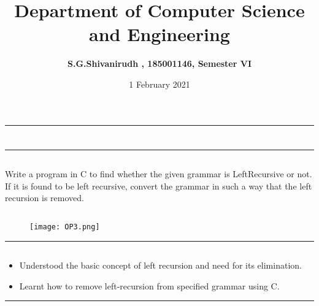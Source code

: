 \documentclass[12pt,letterpaper]{article}
\title{\textbf{Department of Computer Science and Engineering}}
\author{\textbf{S.G.Shivanirudh , 185001146, Semester VI }}
\date{1 February 2021}
\begin{document}
\maketitle
\hrule
\section*{}
\hrule 
\bigskip\bigskip

\subsection*{}

\subsection*{}
\begin{flushleft}
    Write a program in C to find whether the given grammar is LeftRecursive or not. If it is found to be left recursive, convert the grammar in such a way that the left recursion is removed.
\end{flushleft}

\subsection*{}
\begin{flushleft}

\end{flushleft}

\newpage
\subsection*{}
\begin{flushleft}
    
\end{flushleft}
\subsection*{}
\begin{figure}[h]
    \centering
    \texttt{[image: OP3.png]}
\end{figure}
\hrule
\subsection*{}
\begin{flushleft}
    \renewcommand{\labelitemi}{$\textendash$}
    \begin{itemize}
        \item Understood the basic concept of left recursion and need for its elimination. 
        \item Learnt how to remove left-recursion from specified grammar using C.
    \end{itemize}
\end{flushleft}
\hrule
\end{document}
